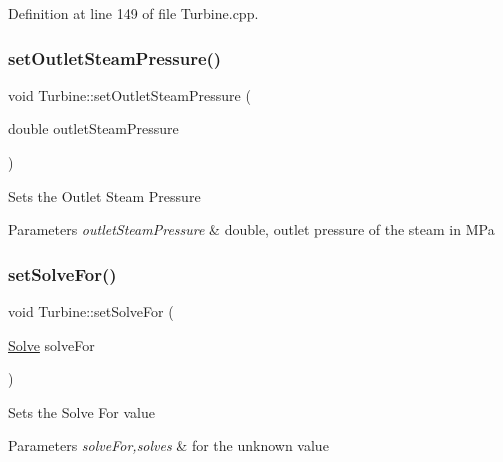 Definition at line 149 of file Turbine.\+cpp.

\mbox{\label{class_turbine_ab9612657de02e4523492b687917b4091}} 
\subsubsection{\texorpdfstring{set\+Outlet\+Steam\+Pressure()}{setOutletSteamPressure()}\hspace{0.1cm}{\footnotesize\ttfamily [3/3]}}
{\footnotesize\ttfamily void Turbine\+::set\+Outlet\+Steam\+Pressure (\begin{DoxyParamCaption}\item[{double}]{outlet\+Steam\+Pressure }\end{DoxyParamCaption})}

Sets the Outlet Steam Pressure


\begin{DoxyParams}{Parameters}
{\em outlet\+Steam\+Pressure} & double, outlet pressure of the steam in M\+Pa \\
\hline
\end{DoxyParams}
\mbox{\label{class_turbine_a96f54a8fc572dae6c5298289de890f4d}} 
\subsubsection{\texorpdfstring{set\+Solve\+For()}{setSolveFor()}\hspace{0.1cm}{\footnotesize\ttfamily [1/3]}}
{\footnotesize\ttfamily void Turbine\+::set\+Solve\+For (\begin{DoxyParamCaption}\item[{\hyperlink{class_turbine_a9fd7beba6c6f071e228fbe3e07969d2b}{Solve}}]{solve\+For }\end{DoxyParamCaption})}

Sets the Solve For value


\begin{DoxyParams}{Parameters}
{\em solve\+For,solves} & for the unknown value \\
\hline
\end{DoxyParams}
\mbox{\label{class_turbine_a96f54a8fc572dae6c5298289de890f4d}} 

